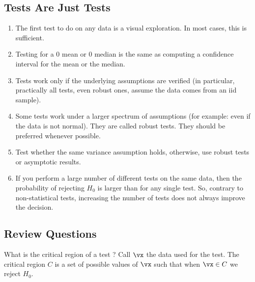 \subsection{Tests Are Just Tests}
\begin{enumerate}
  \item The first test to do on any data is a visual exploration. In most cases, this is
  sufficient.
  \item Testing for a $0$ mean or $0$ median is the same as
  computing a confidence interval for the mean or the median.
  \item Tests work only if the underlying assumptions are
      verified (in particular, practically all tests, even
      robust ones, assume the data comes from an iid
 sample).
  \item Some tests work under a larger spectrum of assumptions (for example: even if the data is
  not normal). They are called robust tests. They should be
  preferred whenever possible.
  \item
  Test whether the same variance assumption holds, otherwise, use robust tests or asymptotic results.
  \item If you perform a large number of different tests on the same data, then the probability
  of rejecting $H_0$ is larger than for any single test. So, contrary to non-statistical tests, increasing the
  number of tests does not always improve the decision.
\end{enumerate}
\subsection{Review Questions}
 {What is the critical region of a test ?
 }
 { Call ${\vx}$ the data used for the test. The critical region $C$ is a set
 of possible values of ${\vx}$ such
 that when ${\vx}\in C$ we
 reject $H_0$.
 }

